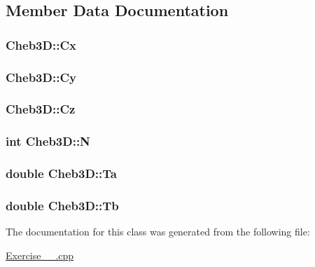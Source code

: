 \subsection{Member Data Documentation}
\hypertarget{classCheb3D_ad7fa118c22a924320f2b4ad57ed7a94c}{
\subsubsection[{Cx}]{ Cheb3\-D\-::\-Cx\hspace{0.3cm}{\ttfamily [private]}}}\label{classCheb3D_ad7fa118c22a924320f2b4ad57ed7a94c}
\hypertarget{classCheb3D_ae3cbac1721d9f6f68ed855081eab5b0d}{
\subsubsection[{Cy}]{ Cheb3\-D\-::\-Cy\hspace{0.3cm}{\ttfamily [private]}}}\label{classCheb3D_ae3cbac1721d9f6f68ed855081eab5b0d}
\hypertarget{classCheb3D_a8fb249e4c2db1a5122102bd02edd10cc}{
\subsubsection[{Cz}]{ Cheb3\-D\-::\-Cz\hspace{0.3cm}{\ttfamily [private]}}}\label{classCheb3D_a8fb249e4c2db1a5122102bd02edd10cc}
\hypertarget{classCheb3D_a2a426a463243e6b20cce4efa20ec58da}{
\subsubsection[{N}]{\setlength{\rightskip}{0pt plus 5cm}int Cheb3\-D\-::\-N\hspace{0.3cm}{\ttfamily [private]}}}\label{classCheb3D_a2a426a463243e6b20cce4efa20ec58da}
\hypertarget{classCheb3D_ab9a5aef68534791393ee45105082d4c4}{
\subsubsection[{Ta}]{\setlength{\rightskip}{0pt plus 5cm}double Cheb3\-D\-::\-Ta\hspace{0.3cm}{\ttfamily [private]}}}\label{classCheb3D_ab9a5aef68534791393ee45105082d4c4}
\hypertarget{classCheb3D_accd9bd76537f3fdbc85a3946d7e25d6e}{
\subsubsection[{Tb}]{\setlength{\rightskip}{0pt plus 5cm}double Cheb3\-D\-::\-Tb\hspace{0.3cm}{\ttfamily [private]}}}\label{classCheb3D_accd9bd76537f3fdbc85a3946d7e25d6e}


The documentation for this class was generated from the following file\-:\begin{DoxyCompactItemize}
\item 
\hyperlink{Exercise__3__2_8cpp}{Exercise\-\_\-\_.\-cpp}\end{DoxyCompactItemize}
